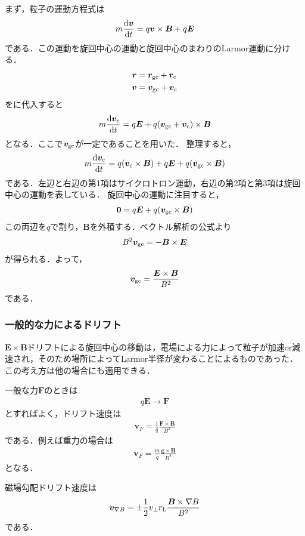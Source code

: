 \documentclass{report}
\begin{document}
        まず，粒子の運動方程式は
        \begin{align}
          m\dv{\bm{v}}{t} = q\bm{v}\times\bm{B} + q\bm{E} \label{eom-cyclotron}
        \end{align}
        である．この運動を旋回中心の運動と旋回中心のまわりのLarmor運動に分ける．
        \begin{align}
          \bm{r} &= \bm{r}_{\mathrm{gc}} + \bm{r}_{\mathrm{c}}\\
          \bm{v} &= \bm{v}_{\mathrm{gc}} + \bm{v}_{\mathrm{c}} \label{drift-velocity}
        \end{align}
        をに代入すると
        \begin{align}
          m \dv{\bm{v}_{\mathrm{c}}}{t} = q\bm{E} + q(\bm{v}_{\mathrm{gc}} + \bm{v}_{\mathrm{c}})\times\bm{B}
        \end{align}
        となる．ここで$\bm{v}_{\mathrm{gc}}$が一定であることを用いた．
        整理すると，
        \begin{align}
          m \dv{\bm{v}_{\mathrm{c}}}{t} = q(\bm{v}_{\mathrm{c}} \times \bm{B}) + q\bm{E} + q(\bm{v}_{\mathrm{gc}}\times\bm{B})
        \end{align}
        である．左辺と右辺の第1項はサイクロトロン運動，右辺の第2項と第3項は旋回中心の運動を表している．
        旋回中心の運動に注目すると，
        \begin{align}
          \bm{0} = q\bm{E} + q(\bm{v}_{\mathrm{gc}}\times\bm{B})
        \end{align}
        この両辺を$q$で割り，$\bm{B}$を外積する．ベクトル解析の公式より
        \begin{align}
          B^2 \bm{v}_{\mathrm{gc}} = -\bm{B} \times \bm{E}
        \end{align}
        が得られる．よって，
        \begin{align}
          \bm{v}_{\mathrm{gc}} = \frac{\bm{E}\times\bm{B}}{B^2}
        \end{align}
        である．

      \subsubsection{一般的な力によるドリフト}
        $\bm{E}\times\bm{B}$ドリフトによる旋回中心の移動は，電場による力によって粒子が加速or減速され，そのため場所によってLarmor半径が変わることによるものであった．
        この考え方は他の場合にも適用できる．

        一般な力$\bm{F}$のときは
        \begin{align}
          q\bm{E} \to \bm{F}
        \end{align}
        とすればよく，ドリフト速度は
        \begin{align}
          \bm{v}_{F} = \frac{1}{q}\frac{\bm{F}\times\bm{B}}{B^2}
        \end{align}
        である．例えば重力の場合は
        \begin{align}
          \bm{v}_{F} = \frac{m}{q}\frac{\bm{g}\times\bm{B}}{B^2}
        \end{align}
        となる．

        磁場勾配ドリフト速度は
        \begin{align}
          \bm{v}_{\nabla B} = \pm \frac{1}{2} v_{\perp} r_{\mathrm{L}} \frac{\bm{B} \times \nabla B}{B^2}
        \end{align}
        である．
\end{document}
